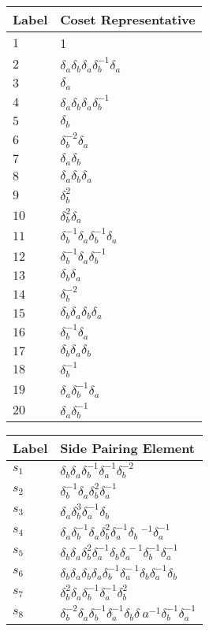 \documentclass{article}
\begin{document}
\begin{center}
\begin{tabular}{ll}
\toprule
Label & Coset Representative\\
\midrule
$1$ & 1 \\
$2$ & $\delta_a^{}\delta_b^{}\delta_a^{}\delta_b^{-1}\delta_a^{}$ \\
$3$ & $\delta_a^{}$ \\
$4$ & $\delta_a^{}\delta_b^{}\delta_a^{}\delta_b^{-1}$ \\
$5$ & $\delta_b^{}$ \\
$6$ & $\delta_b^{-2}\delta_a^{}$ \\
$7$ & $\delta_a^{}\delta_b^{}$ \\
$8$ & $\delta_a^{}\delta_b^{}\delta_a^{}$ \\
$9$ & $\delta_b^{2}$ \\
$10$ & $\delta_b^{2}\delta_a^{}$ \\
$11$ & $\delta_b^{-1}\delta_a^{}\delta_b^{-1}\delta_a^{}$ \\
$12$ & $\delta_b^{-1}\delta_a^{}\delta_b^{-1}$ \\
$13$ & $\delta_b^{}\delta_a^{}$ \\
$14$ & $\delta_b^{-2}$ \\
$15$ & $\delta_b^{}\delta_a^{}\delta_b^{}\delta_a^{}$ \\
$16$ & $\delta_b^{-1}\delta_a^{}$ \\
$17$ & $\delta_b^{}\delta_a^{}\delta_b^{}$ \\
$18$ & $\delta_b^{-1}$ \\
$19$ & $\delta_a^{}\delta_b^{-1}\delta_a^{}$ \\
$20$ & $\delta_a^{}\delta_b^{-1}$ \\
\bottomrule
\end{tabular}
\hfill
\begin{tabular}{ll}
\toprule
Label & Side Pairing Element\\
\midrule
$s_{1}$ & $\delta_b^{}\delta_a^{}\delta_b^{-1}\delta_a^{-1}\delta_b^{-2}$ \\
$s_{2}$ & $\delta_b^{-1}\delta_a^{}\delta_b^{2}\delta_a^{-1}$ \\
$s_{3}$ & $\delta_a^{}\delta_b^{3}\delta_a^{-1}\delta_b^{}$ \\
$s_{4}$ & $\delta_a^{}\delta_b^{-1}\delta_a^{}\delta_b^{2}\delta_a^{-1}\delta_b\
^{-1}\delta_a^{-1}$ \\
$s_{5}$ & $\delta_b^{}\delta_a^{}\delta_b^{2}\delta_a^{-1}\delta_b^{}\delta_a^{\
-1}\delta_b^{-1}\delta_a^{-1}$ \\
$s_{6}$ & $\delta_b^{}\delta_a^{}\delta_b^{}\delta_a^{}\delta_b^{-1}\delta_a^{-\
1}\delta_b^{}\delta_a^{-1}\delta_b^{}$ \\
$s_{7}$ & $\delta_b^{2}\delta_a^{}\delta_b^{-1}\delta_a^{-1}\delta_b^{2}$ \\
$s_{8}$ & $\delta_b^{-2}\delta_a^{}\delta_b^{-1}\delta_a^{-1}\delta_b^{}\delta_\
a^{-1}\delta_b^{-1}\delta_a^{-1}$ \\
\bottomrule
\end{tabular}
\end{center}

\thispagestyle{empty}
\end{document}
